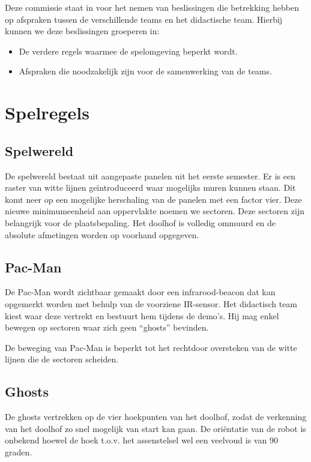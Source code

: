 \documentclass[12pt,a4paper]{report}
\begin{document}
Deze commissie staat in voor het nemen van beslissingen die betrekking hebben op afspraken tussen de verschillende teams en het didactische team. Hierbij kunnen we deze beslissingen groeperen in:

\begin{itemize}
	\item De verdere regels waarmee de spelomgeving beperkt wordt.
	\item Afspraken die noodzakelijk zijn voor de samenwerking van de teams.
\end{itemize}

\section{Spelregels}

\subsection{Spelwereld}

De spelwereld bestaat uit aangepaste panelen uit het eerste semester. Er is een raster van witte lijnen ge\"introduceerd waar mogelijks muren kunnen staan. Dit komt neer op een mogelijke herschaling van de panelen met een factor vier. Deze nieuwe minimumeenheid aan oppervlakte noemen we sectoren. Deze sectoren zijn belangrijk voor de plaatsbepaling. Het doolhof is volledig ommuurd en de absolute afmetingen worden op voorhand opgegeven.

\subsection{Pac-Man}

De Pac-Man wordt zichtbaar gemaakt door een infrarood-beacon dat kan opgemerkt worden met behulp van de voorziene IR-sensor. Het didactisch team kiest waar deze vertrekt en bestuurt hem tijdens de demo's. Hij mag enkel bewegen op sectoren waar zich geen ``ghosts'' bevinden.

De beweging van Pac-Man is beperkt tot het rechtdoor oversteken van de witte lijnen die de sectoren scheiden.

\subsection{Ghosts}

De ghosts vertrekken op de vier hoekpunten van het doolhof, zodat de verkenning van het doolhof zo snel mogelijk van start kan gaan. De ori\"entatie van de robot is onbekend hoewel de hoek t.o.v. het assenstelsel wel een veelvoud is van 90 graden.
\end{document}

